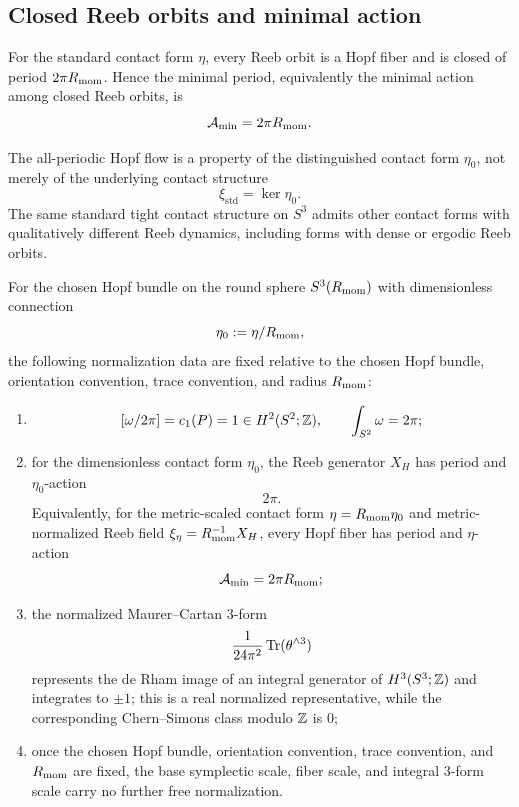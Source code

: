\documentclass[11pt]{article}
\begin{document}
\subsection{Closed Reeb orbits and minimal action}
\label{p1:der:capacities}

For the standard contact form \(\eta\), every Reeb orbit is a Hopf fiber and is
closed of period \(2\pi R_{\mathrm{mom}}\). Hence the minimal period, equivalently the minimal
action among closed Reeb orbits, is
\[
\mathcal A_{\min}=2\pi R_{\mathrm{mom}}.
\]

\begin{remark}
The all-periodic Hopf flow is a property of the distinguished contact form
\(\eta_0\), not merely of the underlying contact structure
\[
\xi_{\mathrm{std}}=\ker\eta_0.
\]
The same standard tight contact structure on \(S^3\) admits other contact forms
with qualitatively different Reeb dynamics, including forms with dense or ergodic
Reeb orbits.
\cite{CasalsSpacil2015}
\end{remark}
\begin{theorem}
\label{p1:thm:hopf-normalization-package}
For the chosen Hopf bundle on the round sphere \(S^3(R_{\mathrm{mom}})\) with dimensionless connection
\[
\eta_0:=\eta/R_{\mathrm{mom}},
\]
the following normalization data are fixed relative to the chosen Hopf bundle, orientation convention, trace convention, and radius \(R_{\mathrm{mom}}\):
\begin{enumerate}
    \item
    \[
    [\omega/2\pi]=c_1(P)=1\in H^2(S^2;\mathbb{Z}),
    \qquad
    \int_{S^2}\omega = 2\pi;
    \]
    \item for the dimensionless contact form \(\eta_0\), the Reeb generator \(X_H\)
    has period and \(\eta_0\)-action
    \[
    2\pi.
    \]
    Equivalently, for the metric-scaled contact form \(\eta=R_{\mathrm{mom}}\eta_0\)
    and metric-normalized Reeb field \(\xi_\eta=R_{\mathrm{mom}}^{-1}X_H\), every Hopf
    fiber has period and \(\eta\)-action
    \[
    \mathcal A_{\min}=2\pi R_{\mathrm{mom}};
    \]
    \item the normalized Maurer--Cartan 3-form
    \[
    \frac{1}{24\pi^2}\operatorname{Tr}(\theta^{\wedge 3})
    \]
    represents the de Rham image of an integral generator of \(H^3(S^3;\mathbb{Z})\) and integrates to \(\pm 1\); this is a real normalized representative, while the corresponding Chern--Simons class modulo \(\mathbb{Z}\) is \(0\);
    \item once the chosen Hopf bundle, orientation convention, trace convention, and \(R_{\mathrm{mom}}\) are fixed, the base symplectic scale, fiber scale, and integral 3-form scale carry no further free normalization.
\end{enumerate}
\end{theorem}
\end{document}
